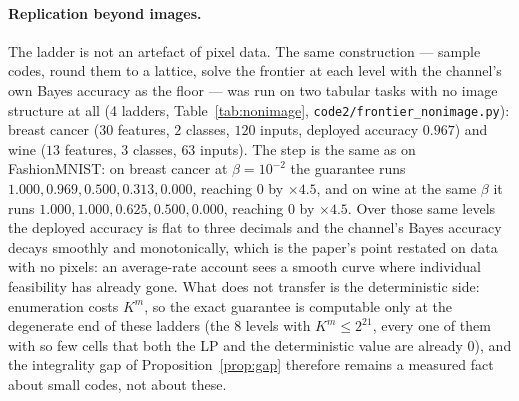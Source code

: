 \documentclass[11pt]{article}
\begin{document}
\paragraph{Replication beyond images.}
The ladder is not an artefact of pixel data. The same construction --- sample codes, round them to a lattice, solve the frontier at each level with the channel's own Bayes accuracy as the floor --- was run on two tabular tasks with no image structure at all (4 ladders, Table~\ref{tab:nonimage}, \texttt{code2/frontier\_nonimage.py}): breast cancer ($30$ features, $2$ classes, $120$ inputs, deployed accuracy $0.967$) and wine ($13$ features, $3$ classes, $63$ inputs). The step is the same as on FashionMNIST: on breast cancer at $\beta=10^{-2}$ the guarantee runs $1.000, 0.969, 0.500, 0.313, 0.000$, reaching $0$ by $\times4.5$, and on wine at the same $\beta$ it runs $1.000, 1.000, 0.625, 0.500, 0.000$, reaching $0$ by $\times4.5$. Over those same levels the deployed accuracy is flat to three decimals and the channel's Bayes accuracy decays smoothly and monotonically, which is the paper's point restated on data with no pixels: an average-rate account sees a smooth curve where individual feasibility has already gone. What does not transfer is the deterministic side: enumeration costs $K^m$, so the exact guarantee is computable only at the degenerate end of these ladders (the 8 levels with $K^m\le2^{21}$, every one of them with so few cells that both the LP and the deterministic value are already $0$), and the integrality gap of Proposition~\ref{prop:gap} therefore remains a measured fact about small codes, not about these.

\begin{table}[t]\centering\scriptsize
\setlength{\tabcolsep}{3pt}
\caption{Rate--congestion ladders on two tabular tasks (breast cancer and wine, scikit-learn arrivals, standardised features, $120$ and $63$ test inputs, $16$ sampled codes each). Columns $\times m$ are lattice steps in units of the encoder's own mean spread $\hat\sigma$, not accuracy values. Upper block: the LP guarantee $t^\star$ at each lattice step with the floor set to the channel's own Bayes accuracy, shown beside the deployed accuracy. Lower block: that floor itself, which decays smoothly while $t^\star$ steps.}
\label{tab:nonimage}
\resizebox{\textwidth}{!}{}
\end{table}
\end{document}
